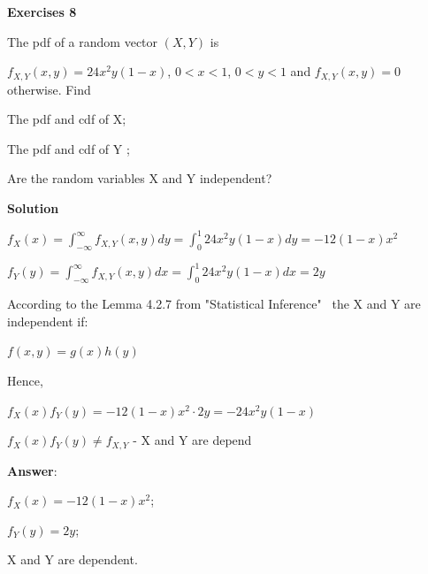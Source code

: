 \documentclass[12pt]{article}
\theoremstyle{definiton}
\theoremstyle{definition}
\theoremstyle{definition}
\begin{document}
		\bigskip
		\textbf{Exercises 8}

		The pdf of a random vector $(X, Y)$ is 
		
$f_{X,Y}\left(x, y\right) = 24x^2 y\left(1-x\right)$, $0<x<1$, $0<y<1$ and $f_{X,Y}\left(x, y\right) = 0$ otherwise. Find
\begin{list}{) ~}{}
\item The pdf and cdf of X;
\item The pdf and cdf of Y ;
\item Are the random variables X and Y independent?
\end{list}
		\medskip
		
		\textbf{Solution}
\begin{list}{) ~}{}		
		\item $f_X(x) = \int_{-\infty}^{\infty} f_{X,Y}(x,y)dy = \int_0^1 24x^2 y\left(1-x\right)dy=-12\left(1-x\right)x^2$
		
		\item $f_Y(y) = \int_{-\infty}^{\infty} f_{X,Y}(x,y)dx = \int_0^1 24x^2 y\left(1-x\right)dx=2y$
		
		\item According to the Lemma 4.2.7 from "Statistical Inference"    \ the X and Y are independent if:
		
		$f(x,y) = g(x)h(y)$
		
		Hence, 
		
		$f_X(x)f_Y(y) = -12\left(1-x\right)x^2 \cdot 2y = -24x^2 y\left(1-x\right)$
		
		$f_X(x)f_Y(y) \neq f_{X, Y}$ - X and Y are depend
		
\end{list}

		\medskip
		\textbf{Answer}:		
\begin{list}{) ~}{}			
		\item $f_X(x)= -12\left(1-x\right)x^2$;
		
		\item $f_Y(y) =2y$;
		
		\item X and Y are dependent.
\end{list}
\end{document}
